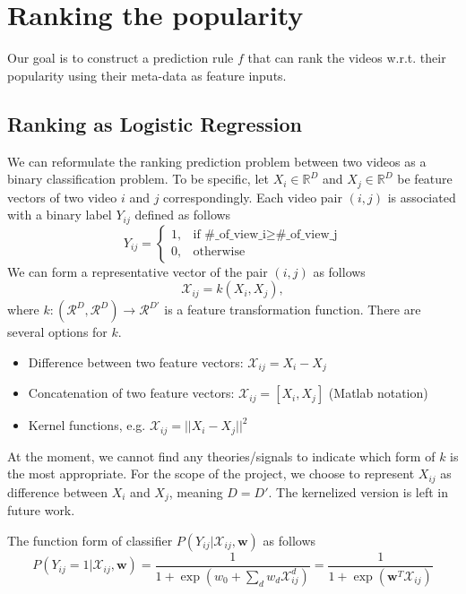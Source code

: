 \section{Ranking the popularity}
\label{sec:ranking}
	
	Our goal is to construct a prediction rule $f$ that can rank the videos w.r.t. their popularity using their meta-data as feature inputs.
	
	\subsection{Ranking as Logistic Regression}
	We can reformulate the ranking prediction problem between two videos as a binary classification problem. To be specific, let $X_i \in \mathbb{R}^D$ and $X_j \in \mathbb{R}^D$ be feature vectors of two video $i$ and $j$ correspondingly. Each video pair $(i, j)$ is associated with a binary label $Y_{ij}$ defined as follows
	\begin{equation}
		Y_{ij} = \begin{cases}
				   1, & \text{if } \text{\#\_of\_view\_i} \geq \text{\#\_of\_view\_j} \\
				   0, & \text{otherwise}
				\end{cases} 
	\end{equation}	
	 We can form a representative vector of the pair $(i, j)$ as follows
	\begin{equation}
		\mathcal{X}_{ij} = k (X_i, X_j),
	\end{equation}
	where $k: (\mathcal{R}^D, \mathcal{R}^D) \rightarrow \mathcal{R}^{D'}$ is a feature transformation function. There are several options for $k$. 
	\begin{itemize}
		\item Difference between two feature vectors: $\mathcal{X}_{ij} = X_i - X_j$
		\item Concatenation of two feature vectors:  $\mathcal{X}_{ij} = [X_i, X_j]$ (Matlab notation)
		\item Kernel functions, e.g. $\mathcal{X}_{ij} = || X_i - X_j ||^2$
	\end{itemize}
	At the moment, we cannot find any theories/signals to indicate which form of $k$ is the most appropriate. For the scope of the project, we choose to represent $X_{ij}$ as difference between $X_i$ and $X_j$, meaning $D = D'$. The kernelized version is left in future work. 
	
	The function form of classifier $P(Y_{ij}|\mathcal{X}_{ij}, \textbf{w})$ as follows
	 \begin{equation}
		 P(Y_{ij}=1|\mathcal{X}_{ij}, \textbf{w}) = \frac{1}{1 + \exp ( w_0 + \sum_d w_d \mathcal{X}_{ij}^d )} = \frac{1}{1 + \exp (\textbf{w}^T \mathcal{X}_{ij})}
	 \end{equation}
	 
